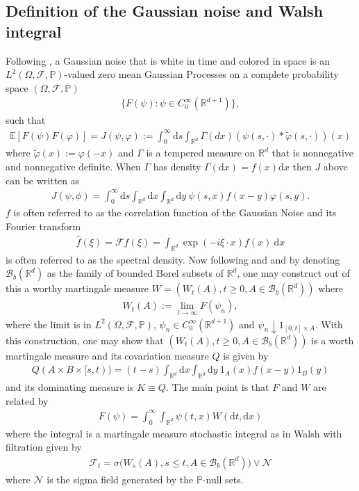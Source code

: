 \documentclass[a4paper,11pt]{article}
\numberwithin{equation}{section}
\theoremstyle{plain}
\theoremstyle{definition}
\newcommand{\R}{\mathbb{R}}
\newcommand{\E}{\mathbb{E}}
\newcommand{\ud}{\ensuremath{\mathrm{d}}}
\begin{document}
\subsection{Definition of the Gaussian noise and Walsh integral}

Following \cite{DalangEtc09Minicourse}, a Gaussian noise that is white in time and colored in space is an
$L^2(\Omega,\mathcal F,\mathbb P)$-valued zero mean Gaussian Processes on a complete probability space $(\Omega,\mathcal F,\mathbb P)$
\begin{align*}
	\{ F(\psi) : \psi \in C_0^\infty(\R^{d+1}) \} ,
\end{align*}
such that 
\begin{align*}
	\E [ F(\psi)F(\varphi) ] = J(\psi,\varphi) := \int_0^\infty \ud s \int_{\R^d}
	\Gamma(dx)(\psi(s,\cdot)*\tilde{\varphi}(s,\cdot))(x)
\end{align*}
 where $\tilde{\varphi}(x):= \varphi(-x)$ and $\Gamma$ is a tempered measure on $\R^d$ that is nonnegative and nonnegative definite. When $\Gamma$ has density $\Gamma(\ud x) = f(x)\ud x$ then $J$ above can be written as 
 \begin{align*}
	 J(\psi,\phi) = \int_0^\infty \ud s \int_{\R^d} \ud x \int_{\R^d} \ud y \: \psi(s,x)f(x-y)\varphi(s,y). 
 \end{align*}
$f$ is often referred to as the correlation function of the Gaussian Noise and its Fourier transform 
\begin{align*}
	\hat{f}(\xi)=\mathcal Ff(\xi) = \int_{\R^d}\exp(-i\xi\cdot x)f(x) \: \ud x 
\end{align*}
is often referred to as the spectral density. Now following \cite{Walsh} and \cite{DalangEtc09Minicourse} and by
denoting $\mathscr B_b(\R^d)$ as the family of bounded Borel subsets of $\R^d$, one may construct out of this a worthy
martingale measure $W=(W_t(A),t\ge 0, A \in \mathscr B_b(\R^d))$ where 
\begin{align*}
	W_t(A):= \lim \limits_{t\to \infty} F(\psi_n),  
\end{align*}
where the limit is in $L^2(\Omega,\mathcal F,\mathbb P)$, $\psi_n \in C_0^\infty(\R^{d+1})$ and $\psi_n \downarrow
1_{[0,t]\times A}. $ With this construction, one may show that $(W_t(A),t\ge 0, A \in \mathscr B_b(\R^d))$ is a worth
martingale measure and its covariation measure $Q$ is given by 
\begin{align*}
	Q(A \times B \times [s,t)) = (t-s)\int_{\R^d} \ud x \int_{\R^d} \ud y \: 1_A(x)f(x-y)1_B(y) 
\end{align*}
and its dominating measure is $K \equiv Q$. The main point is that $F$ and $W$ are related by 
\begin{align*}
	F(\psi) = \int_0^\infty \int_{\R^d} \psi (t,x) W(\ud t, \ud x) 
\end{align*}
where the integral is a martingale measure stochastic integral as in Walsh with filtration given by 
\begin{align*}
	\mathcal F_t = \sigma \big(W_s(A), s \le t, A \in \mathscr B_b(\R^d) \big) \vee \mathscr N  
\end{align*}
where $\mathscr N$ is the sigma field generated by the $\mathbb P$-null sets. 
\end{document}
